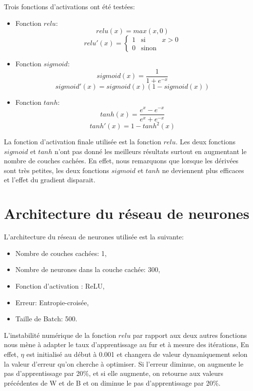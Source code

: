 \documentclass[a4paper,english,12pt]{article}
\begin{document}
Trois fonctions d'activations ont été testées:

\begin{itemize}
	\item Fonction $relu$:	
		$$relu(x)=max(x,0)$$		
		\begin{equation}
		relu'(x) = \left\{ \begin{array}{rcl}
		{1} & \mbox{si}
		& x>0 \\ 0 & \mbox{sinon}
		\end{array}\right.\label{eq2}
		\end{equation}
	\item Fonction $sigmoid$:
		$$ sigmoid(x) = \frac{1}{1 + e^{-x}}$$
		$$sigmoid'(x)=sigmoid(x)(1-sigmoid(x))$$
	\item  Fonction $tanh$:	
		$$ tanh(x) = \frac{e^{x} - e^{-x}}{e^{x} + e^{-x}}$$
		$$ tanh'(x)=1-tanh^2(x)$$
\end{itemize}

La fonction d'activation finale utilisée est la fonction $relu$. Les deux fonctions $sigmoid$ et $tanh$ n'ont pas donné les meilleurs résultats surtout en augmentant le nombre de couches cachées. En effet, nous remarquons que lorsque les dérivées sont très petites, les deux fonctions $sigmoid$ et $tanh$ ne deviennent plus efficaces et l'effet du gradient disparait. 

\section{Architecture du réseau de neurones}
L'architecture du réseau de neurones utilisée est la suivante: 
\begin{itemize}
	\item Nombre de couches cachées: 1,
	\item Nombre de neurones dans la couche cachée: 300,
	\item Fonction d'activation : ReLU,
	\item Erreur: Entropie-croisée,
	\item Taille de Batch: 500.
\end{itemize}

L'instabilité numérique de la fonction $relu$ par rapport aux deux autres fonctions nous mène à adapter le taux d'apprentissage au fur et à mesure des itérations, En effet, $\eta$ est initialisé au début à 0.001 et  changera de valeur dynamiquement selon la valeur d'erreur qu'on cherche à optimiser. Si l'erreur diminue, on augmente le pas d'apprentissage par 20\%, et si elle augmente, on retourne aux valeurs précédentes de W et de B et on diminue le pas d'apprentissage par 20\%.
\end{document}
